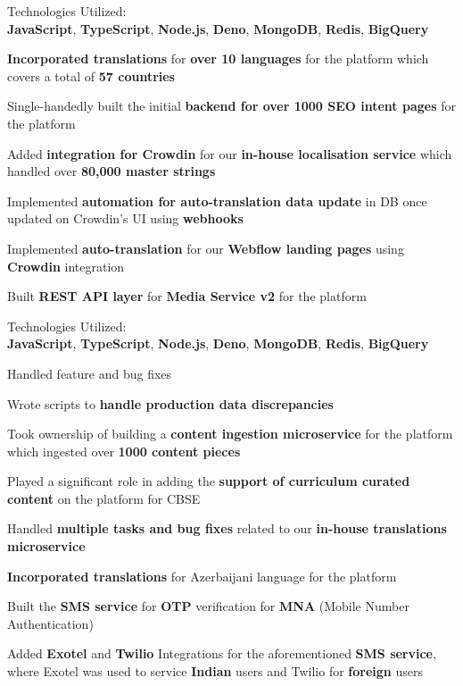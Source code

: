 \documentclass[]{deedy-resume-openfont}
\begin{document}
\begin{minipage}[t]{0.66\textwidth}
\sectionsep
\begin{tightemize}
\item Technologies Utilized: \\\textbf{JavaScript}, \textbf{TypeScript}, \textbf{Node.js}, \textbf{Deno}, \textbf{MongoDB}, \textbf{Redis}, \textbf{BigQuery}
\item \textbf{Incorporated translations} for \textbf{over 10 languages} for the platform which covers a total of \textbf{57 countries}
\item Single-handedly built the initial \textbf{backend for over 1000 SEO intent pages} for the platform
\item Added \textbf{integration for Crowdin} for our \textbf{in-house localisation service} which handled over \textbf{80,000 master strings}
\item Implemented \textbf{automation for auto-translation data update} in DB once updated on Crowdin's UI using \textbf{webhooks}
\item Implemented \textbf{auto-translation} for our \textbf{Webflow landing pages} using \textbf{Crowdin} integration
\item Built \textbf{REST API layer} for \textbf{Media Service v2} for the platform
\end{tightemize}
\sectionsep

\sectionsep
\begin{tightemize}
\item Technologies Utilized: \\\textbf{JavaScript}, \textbf{TypeScript}, \textbf{Node.js}, \textbf{Deno}, \textbf{MongoDB}, \textbf{Redis}, \textbf{BigQuery}
\item Handled feature and bug fixes
\item Wrote scripts to \textbf{handle production data discrepancies}
\item Took ownership of building a \textbf{content ingestion microservice} for the platform which ingested over \textbf{1000 content pieces}
\item Played a significant role in adding the \textbf{support of curriculum curated content} on the platform for CBSE
\item Handled \textbf{multiple tasks and bug fixes} related to our \textbf{in-house translations microservice}
\item \textbf{Incorporated translations} for Azerbaijani language for the platform
\item Built the \textbf{SMS service} for \textbf{OTP} verification for \textbf{MNA} (Mobile Number Authentication)
\item Added \textbf{Exotel} and \textbf{Twilio} Integrations for the aforementioned \textbf{SMS service}, where Exotel was used to service \textbf{Indian} users and Twilio for \textbf{foreign} users
\end{tightemize}
\sectionsep


\end{minipage}
\end{document}
